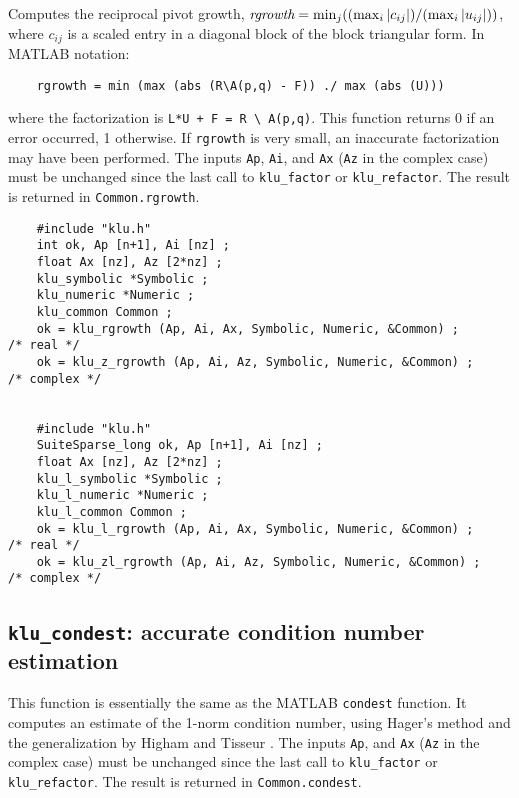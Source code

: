 \documentclass[11pt]{article}
\begin{document}
Computes the reciprocal pivot growth,
$\mbox{\em rgrowth} = \min_j (( \max_i |c_{ij}| ) / ( \max_i |u_{ij}| ))$,
where $c_{ij}$ is a scaled entry in a diagonal block of the block triangular
form.  In MATLAB notation:
\begin{verbatim}
    rgrowth = min (max (abs (R\A(p,q) - F)) ./ max (abs (U)))
\end{verbatim}
where the factorization is \verb'L*U + F = R \ A(p,q)'.
This function returns 0 if an error occurred, 1 otherwise.  If {\tt rgrowth} is
very small, an inaccurate factorization may have been performed.  The inputs
{\tt Ap}, {\tt Ai}, and {\tt Ax}  ({\tt Az} in the complex case) must be
unchanged since the last call to {\tt klu\_factor} or {\tt klu\_refactor}.  The
result is returned in {\tt Common.rgrowth}.

{\footnotesize
\begin{verbatim}
    #include "klu.h"
    int ok, Ap [n+1], Ai [nz] ;
    float Ax [nz], Az [2*nz] ;
    klu_symbolic *Symbolic ;
    klu_numeric *Numeric ;
    klu_common Common ;
    ok = klu_rgrowth (Ap, Ai, Ax, Symbolic, Numeric, &Common) ;                       /* real */
    ok = klu_z_rgrowth (Ap, Ai, Az, Symbolic, Numeric, &Common) ;                     /* complex */


    #include "klu.h"
    SuiteSparse_long ok, Ap [n+1], Ai [nz] ;
    float Ax [nz], Az [2*nz] ;
    klu_l_symbolic *Symbolic ;
    klu_l_numeric *Numeric ;
    klu_l_common Common ;
    ok = klu_l_rgrowth (Ap, Ai, Ax, Symbolic, Numeric, &Common) ;                     /* real */
    ok = klu_zl_rgrowth (Ap, Ai, Az, Symbolic, Numeric, &Common) ;                    /* complex */
\end{verbatim}
}

\subsection{{\tt klu\_condest}: accurate condition number estimation}

This function is essentially the same as the MATLAB {\tt condest} function.  It
computes an estimate of the 1-norm condition number, using Hager's method
\cite{Hager84} and the generalization by Higham and Tisseur
\cite{HighamTisseur00}.  The inputs {\tt Ap}, and {\tt Ax} ({\tt Az} in the
complex case) must be unchanged since the last call to {\tt klu\_factor} or
{\tt klu\_refactor}.  The result is returned in {\tt Common.condest}.
\end{document}
